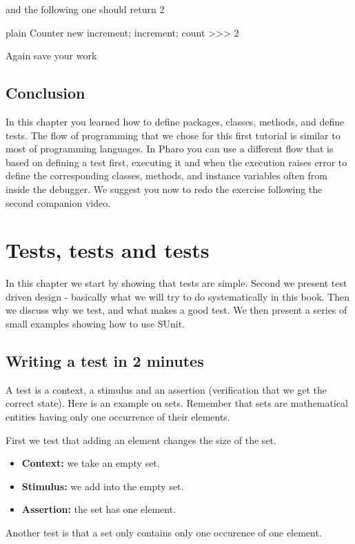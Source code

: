 \documentclass[10pt,twoside,english]{_support/latex/sbabook/sbabook}
\begin{document}
and the following one should return 2

\begin{displaycode}{plain}
Counter new increment; increment; count
>>> 2
\end{displaycode}

Again save your work
\section{Conclusion}
In this chapter you learned how to define packages, classes, methods, and define tests.
The flow of programming that we chose for this first tutorial is similar to most of programming languages.
In Pharo you can use a different flow that is based on defining a test first, executing it and when the execution raises error to define the corresponding classes, methods, and instance variables often from inside the debugger. We suggest you now to redo the exercise following the second companion video.

\chapter{Tests, tests and tests}\label{cha:sunit}
In this chapter we start by showing that tests are simple. Second we present test driven design - basically what we will try to do systematically in this book. Then we discuss why we test, and what makes a good test.
We then present a series of small examples showing how to use SUnit. 
\section{Writing a test in 2 minutes}
A test is a context, a stimulus and an assertion (verification that we get the correct state).
Here is an example on sets. Remember that sets are mathematical entities having only one occurrence of their elements.

First we test that adding an element changes the size of the set.

\begin{itemize}
\item \textbf{Context:} we take an empty set.
\item \textbf{Stimulus:} we add  into the empty set.
\item \textbf{Assertion:} the set has one element.
\end{itemize}

Another test is that a set only contains only one occurence of one element.
\end{document}
